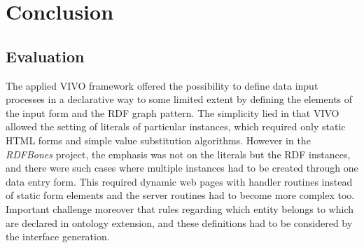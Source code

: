 

\chapter{Conclusion}

\section{Evaluation}

The applied VIVO framework offered the possibility to define data input processes in a declarative way to some limited extent by defining the elements of the input form and the RDF graph pattern. The simplicity lied in that VIVO allowed the setting of literals of particular instances, which required only static HTML forms and simple value substitution algorithms. However in the \textit{RDFBones} project, the emphasis was not on the literals but the RDF instances, and there were such cases where multiple instances had to be created through one data entry form. This required dynamic web pages with handler routines instead of static form elements and the server routines had to become more complex too. Important challenge moreover that rules regarding which entity belongs to which are declared in ontology extension, and these definitions had to be considered by the interface generation.

